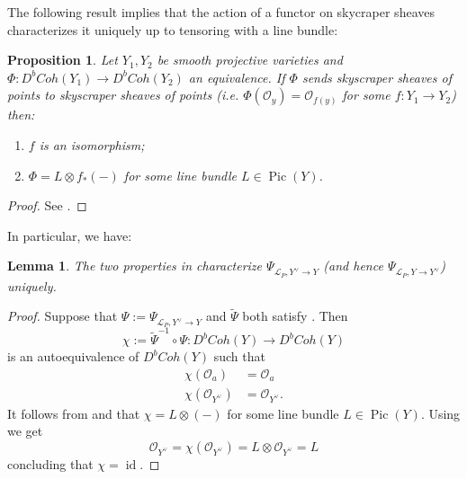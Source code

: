 \documentclass[10pt]{amsart}
\newtheorem{lem}[thm]{Lemma}
\newtheorem{prop}[thm]{Proposition}
\theoremstyle{definition}
\theoremstyle{remark}
\DeclareMathOperator{\id}{id}
\DeclareMathOperator{\Pic}{Pic}
\def\inv{^{-1}}
\newcommand{\mcal}{\mathcal}
\begin{document}
The following result implies that the action of a functor on skycraper sheaves characterizes it uniquely up to tensoring with a line bundle:
\begin{prop}\label{prop:action_on_sky_characterizes}
    Let $Y_1,Y_2$ be smooth projective varieties and $\Phi: D^bCoh(Y_1) \to D^bCoh(Y_2)$ an equivalence.
    If $\Phi$ sends skyscraper sheaves of points to skyscraper sheaves of points (i.e. $\Phi(\mcal O_y) = \mcal O_{f(y)}$ for some $f: Y_1 \to Y_2$) then:
    \begin{enumerate}
        \item $f$ is an isomorphism;
        \item $\Phi = L \otimes f_*(-)$ for some line bundle $L \in \Pic(Y)$.
    \end{enumerate}
\end{prop}
\begin{proof}
    See \cite[Corollary 5.23]{huybrechts2006fourier}.
\end{proof}

In particular, we have:
\begin{lem}\label{lem:properties_Poincare_characterize}
    The two properties in  characterize $\Psi_{\mcal L_P, Y^\vee \to Y}$ (and hence $\Psi_{\mcal L_P, Y \to Y^\vee}$) uniquely.
\end{lem}
\begin{proof}
    Suppose that $\Psi := \Psi_{\mcal L_P, Y^\vee \to Y}$ and $\tilde\Psi$ both satisfy . 
    Then 
    $$
    \chi:= \tilde\Psi\inv \circ \Psi: D^bCoh(Y) \to D^bCoh(Y)
    $$
    is an autoequivalence of $D^bCoh(Y)$ such that 
    \begin{align}
        \chi(\mcal O_a) &= \mcal O_a \label{eq:sky_to_sky}\\
        \chi(\mcal O_{Y^\vee}) &= \mcal O_{Y^\vee} \label{eq:str_to_str}.
    \end{align}
    It follows from  and  that $\chi = L \otimes (-)$ for some line bundle $L \in \Pic(Y)$.
    Using  we get
    $$
    \mcal O_{Y^\vee} = \chi(\mcal O_{Y^\vee}) = L\otimes  \mcal O_{Y^\vee} = L
    $$
    concluding that $\chi =\id$.
\end{proof}
\end{document}

